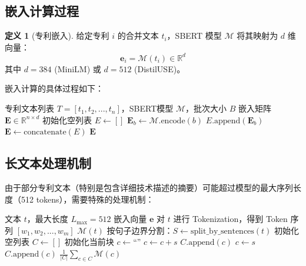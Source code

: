 \documentclass[12pt,a4paper]{article}
\theoremstyle{definition}
\newtheorem{definition}{定义}[section]
\newcommand{\vect}[1]{\mathbf{#1}}
\newcommand{\mat}[1]{\mathbf{#1}}
\newcommand{\R}{\mathbb{R}}
\begin{document}
\subsection{嵌入计算过程}

\begin{definition}[专利嵌入]
给定专利 $i$ 的合并文本 $t_i$，SBERT 模型 $\mathcal{M}$ 将其映射为 $d$ 维向量：
\begin{equation}
    \vect{e}_i = \mathcal{M}(t_i) \in \R^d
\end{equation}
其中 $d = 384$ (MiniLM) 或 $d = 512$ (DistilUSE)。
\end{definition}

嵌入计算的具体过程如下：

\begin{algorithm}[H]
    \caption{SBERT 嵌入计算}
    \label{alg:embedding}
    \begin{algorithmic}[1]
        \Require 专利文本列表 $T = [t_1, t_2, ..., t_n]$，SBERT模型 $\mathcal{M}$，批次大小 $B$
        \Ensure 嵌入矩阵 $\mat{E} \in \R^{n \times d}$
        \State 初始化空列表 $E \leftarrow []$
            \State $\mat{E}_b \leftarrow \mathcal{M}.\text{encode}(b)$
            \State $E.\text{append}(\mat{E}_b)$
        \EndFor
        \State $\mat{E} \leftarrow \text{concatenate}(E)$
        \State \Return $\mat{E}$
    \end{algorithmic}
\end{algorithm}

\subsection{长文本处理机制}

由于部分专利文本（特别是包含详细技术描述的摘要）可能超过模型的最大序列长度（512 tokens），需要特殊的处理机制：

\begin{algorithm}[H]
    \caption{长文本分块处理}
    \label{alg:chunking}
    \begin{algorithmic}[1]
        \Require 文本 $t$，最大长度 $L_{\max} = 512$
        \Ensure 嵌入向量 $\vect{e}$
        \State 对 $t$ 进行 Tokenization，得到 Token 序列 $[w_1, w_2, ..., w_m]$
            \State \Return $\mathcal{M}(t)$ 
        \Else
            \State 按句子边界分割：$S \leftarrow \text{split\_by\_sentences}(t)$
            \State 初始化空列表 $C \leftarrow []$
            \State 初始化当前块 $c \leftarrow \text{``''}$
                    \State $c \leftarrow c + s$
                \Else
                    \State $C.\text{append}(c)$
                    \State $c \leftarrow s$
                \EndIf
            \EndFor
            \State $C.\text{append}(c)$ 
            \State \Return $\frac{1}{|C|} \sum_{c \in C} \mathcal{M}(c)$ 
        \EndIf
    \end{algorithmic}
\end{algorithm}
\end{document}
